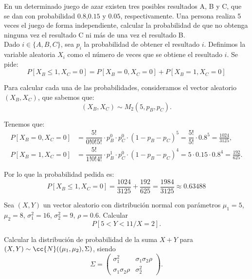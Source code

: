 \begin{ejercicio}
    En un determinado juego de azar existen tres posibles resultados A, B y C, que se dan con probabilidad $0.8$,$0.15$ y $0.05$, respectivamente. Una persona realiza 5 veces el juego de forma independiente, calcular la probabilidad de que no obtenga ninguna vez el resultado C ni más de una vez el resultado B.\\

    Dado $i\in \{A,B,C\}$, sea $p_i$ la probabilidad de obtener el resultado $i$. Definimos la variable aleatoria $X_i$ como el número de veces que se obtiene el resultado $i$. Se pide:
    \begin{equation*}
        P[X_B \leq 1,X_C = 0] = P[X_B = 0,X_C = 0] + P[X_B = 1,X_C = 0]
    \end{equation*}

    Para calcular cada una de las probabilidades, consideramos el vector aleatorio $(X_B,X_C)$, que sabemos que:
    \begin{equation*}
        (X_B,X_C) \sim M_2\left(5,p_B,p_C\right).
    \end{equation*}

    Tenemos que:
    \begin{align*}
        P[X_B = 0,X_C = 0] &= \dfrac{5!}{0!0!5!}\cdot p_B^0 \cdot p_C^0 \cdot (1-p_B-p_C)^5 = \dfrac{5!}{5!} \cdot 0.8^5 = \frac{1024}{3125},\\
        P[X_B = 1,X_C = 0] &= \dfrac{5!}{1!0!4!}\cdot p_B^1 \cdot p_C^0 \cdot (1-p_B-p_C)^4 = 5 \cdot 0.15 \cdot 0.8^4= \frac{192}{625}.
    \end{align*}

    Por lo que la probabilidad pedida es:
    \begin{equation*}
        P[X_B \leq 1,X_C = 0] = \frac{1024}{3125} + \frac{192}{625} = \frac{1984}{3125} \approx 0.63488
    \end{equation*}
\end{ejercicio}

\begin{ejercicio}
    Sea $(X,Y)$ un vector aleatorio con distribución normal con parámetros $\mu_1 = 5$, $\mu_2 = 8$, $\sigma_1^2 = 16$, $\sigma_2^2 = 9$, $\rho = 0.6$. Calcular
    \[
        P[5 < Y < 11/X = 2].
    \]
\end{ejercicio}

\begin{ejercicio}
    Calcular la distribución de probabilidad de la suma $X + Y$ para $(X,Y) \sim \cc{N}((\mu_1,\mu_2),\Sigma)$, siendo
    \[
        \Sigma = \begin{pmatrix}
            \sigma_1^2 & \sigma_1\sigma_2\rho \\
            \sigma_1\sigma_2\rho & \sigma_2^2
        \end{pmatrix}.
    \]
\end{ejercicio}

